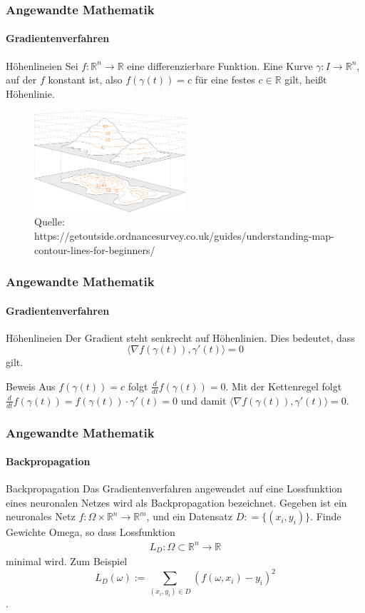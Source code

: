 \documentclass{beamer}
\begin{document}
\begin{frame}
    \frametitle{Angewandte Mathematik}
\framesubtitle{Gradientenverfahren}
    \begin{block}{Höhenlineien}
Sei  $f: \mathbb{R}^n \to \mathbb{R}$  eine differenzierbare Funktion. Eine Kurve $\gamma : I \to \mathbb{R}^n$, auf der $f$ konstant ist, also 
$f(\gamma(t)) = c$ für eine festes $c \in \mathbb{R}$ gilt, heißt Höhenlinie.
\end{block}

\begin{figure}[H]
      \centering
    \includegraphics[width=0.5\textwidth]{images/Contours-and-relief}
      \caption{Quelle: https://getoutside.ordnancesurvey.co.uk/guides/understanding-map-contour-lines-for-beginners/}
\end{figure}

 \end{frame}


\begin{frame}
    \frametitle{Angewandte Mathematik}
\framesubtitle{Gradientenverfahren}
    \begin{block}{Höhenlineien}
Der Gradient steht senkrecht auf  Höhenlinien. Dies bedeutet, dass $$ \bigl \langle \nabla f(\gamma(t)), \gamma'(t) \bigr \rangle = 0$$ gilt. 

\end{block}
    \begin{block}{Beweis}
Aus $f(\gamma(t)) = c$ folgt $\frac{d}{dt} f(\gamma(t)) = 0$. Mit der Kettenregel folgt $\frac{d}{dt} f(\gamma(t)) =  f(\gamma(t)) \cdot \gamma'(t) = 0$ und damit
$ \bigl \langle \nabla f(\gamma(t)), \gamma'(t) \bigr \rangle = 0$.
\end{block}

 \end{frame}



\begin{frame}
    \frametitle{Angewandte Mathematik}
\framesubtitle{Backpropagation}
    \begin{block}{Backpropagation}
Das Gradientenverfahren angewendet auf eine Lossfunktion eines neuronalen Netzes wird als Backpropagation bezeichnet.
Gegeben ist ein neuronales Netz $f : \Omega \times \mathbb{R}^n \to \mathbb{R}^m$, 
und ein  Datensatz $D : = \{ (x_i, y_i) \}$. Finde Gewichte Omega, so dass Lossfunktion
\begin{align*}
L_D  : \Omega \subset \mathbb{R}^n \to \mathbb{R} 
\end{align*}
minimal wird. Zum Beispiel $$L_D(\omega) := \sum_{(x_i,y_i) \in D} (f(\omega, x_i) - y_i)^2$$.

\end{block}
 \end{frame}
\end{document}
